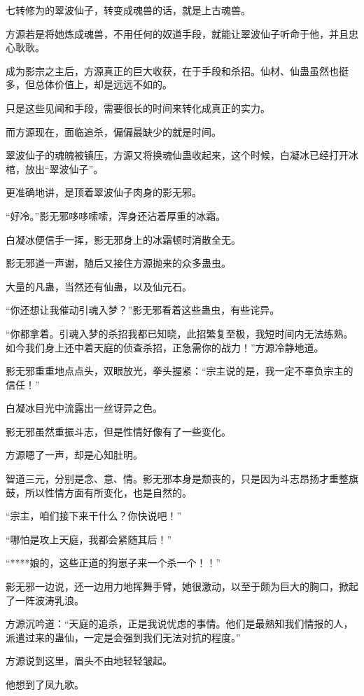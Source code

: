 \begin{this_body}
七转修为的翠波仙子，转变成魂兽的话，就是上古魂兽。

方源若是将她炼成魂兽，不用任何的奴道手段，就能让翠波仙子听命于他，并且忠心耿耿。

成为影宗之主后，方源真正的巨大收获，在于手段和杀招。仙材、仙蛊虽然也挺多，但总体价值上，却是远远不如的。

只是这些见闻和手段，需要很长的时间来转化成真正的实力。

而方源现在，面临追杀，偏偏最缺少的就是时间。

翠波仙子的魂魄被镇压，方源又将换魂仙蛊收起来，这个时候，白凝冰已经打开冰棺，放出“翠波仙子”。

更准确地讲，是顶着翠波仙子肉身的影无邪。

“好冷。”影无邪哆哆嗦嗦，浑身还沾着厚重的冰霜。

白凝冰便信手一挥，影无邪身上的冰霜顿时消散全无。

影无邪道一声谢，随后又接住方源抛来的众多蛊虫。

大量的凡蛊，当然还有仙蛊，以及仙元石。

“你还想让我催动引魂入梦？”影无邪看着这些蛊虫，有些诧异。

“你都拿着。引魂入梦的杀招我都已知晓，此招繁复至极，我短时间内无法练熟。如今我们身上还中着天庭的侦查杀招，正急需你的战力！”方源冷静地道。

影无邪重重地点点头，双眼放光，拳头握紧：“宗主说的是，我一定不辜负宗主的信任！”

白凝冰目光中流露出一丝讶异之色。

影无邪虽然重振斗志，但是性情好像有了一些变化。

方源嗯了一声，却是心知肚明。

智道三元，分别是念、意、情。影无邪本身是颓丧的，只是因为斗志昂扬才重整旗鼓，所以性情方面有所变化，也是自然的。

“宗主，咱们接下来干什么？你快说吧！”

“哪怕是攻上天庭，我都会紧随其后！”

“****娘的，这些正道的狗崽子来一个杀一个！！”

影无邪一边说，还一边用力地挥舞手臂，她很激动，以至于颇为巨大的胸口，掀起了一阵波涛乳浪。

方源沉吟道：“天庭的追杀，正是我说忧虑的事情。他们是最熟知我们情报的人，派遣过来的蛊仙，一定是会强到我们无法对抗的程度。”

方源说到这里，眉头不由地轻轻皱起。

他想到了凤九歌。


\end{this_body}
